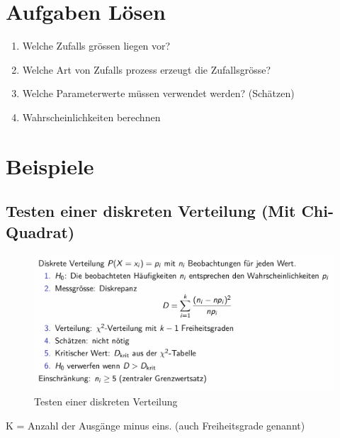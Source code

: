 \documentclass[../Main.tex]{subfiles}
\begin{document}


\section{Aufgaben Lösen}
\begin{enumerate}
    \item Welche Zufalls grössen liegen vor?
    \item Welche Art von Zufalls prozess erzeugt die Zufallsgrösse?
    \item Welche Parameterwerte müssen verwendet werden? (Schätzen)
    \item Wahrscheinlichkeiten berechnen
\end{enumerate}

\section{Beispiele}
\subsection{Testen einer diskreten Verteilung (Mit Chi-Quadrat)}

\begin{figure}[H]
    \centering
    \includegraphics[width=1\linewidth]{Images/test-diskrete-verteilung.png}
    \caption{Testen einer diskreten Verteilung}
\end{figure}
K = Anzahl der Ausgänge minus eins. (auch Freiheitsgrade genannt)
\end{document}
